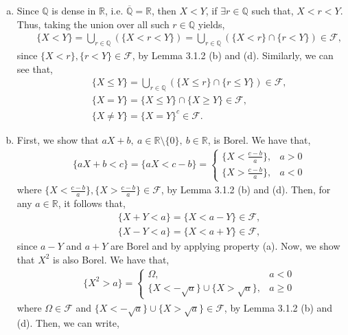 \documentclass{article}
\begin{document}
\begin{enumerate}[(a)]
	\item Since $\mathbb{Q}$ is dense in $\mathbb{R}$, i.e. $\overline{\mathbb{Q}} = \mathbb{R}$, then $X <Y$, if $\exists r \in \mathbb{Q}$ such that, $X < r < Y$. Thus, taking the union over all such $r \in \mathbb{Q}$ yields,
	\begin{eqnarray}
	\nonumber
	&&\{X < Y\} = \bigcup_{r\in\mathbb{Q}}(\{X < r < Y\}) = \bigcup_{r\in\mathbb{Q}}(\{X<r\}\cap\{r<Y\}) \in \mathcal{F},
	\end{eqnarray}
	since $\{X<r\},\{r<Y\} \in \mathcal{F}$, by Lemma 3.1.2 (b) and (d). Similarly, we can see that,
	\begin{eqnarray}
	\nonumber
	&&\{X \leq Y\} = \bigcup_{r\in\mathbb{Q}}(\{X \leq r\}\cap\{r \leq Y\}) \in \mathcal{F},\\
	\nonumber
	&{}&\{X=Y\} = \{X \leq Y\} \cap \{X \geq Y\} \in \mathcal{F},\\
	\nonumber
	&{}&\{X \neq Y\} = \{X=Y\}^c \in \mathcal{F}.
	\end{eqnarray}
	\item First, we show that $aX + b, \ a \in \mathbb{R}\setminus\{0\}, \ b \in \mathbb{R}$, is Borel. We have that,
	\begin{eqnarray}
	\nonumber
	&&\{aX+b < c\} = \{aX < c-b\} =
	\begin{cases}
	\{X < \frac{c-b}{a}\}, & a > 0 \\
	\{X > \frac{c-b}{a}\}, & a < 0
	\end{cases}
	\end{eqnarray}
	where $\{X < \frac{c-b}{a}\}, \{X > \frac{c-b}{a}\} \in \mathcal{F}$, by Lemma 3.1.2 (b) and (d). Then, for any $a \in \mathbb{R}$, it follows that,
	\begin{eqnarray}
	\nonumber
	&&\{X+Y < a\} = \{X < a - Y\} \in \mathcal{F},\\
	\nonumber
	&{}& \{X-Y < a\} = \{X < a + Y\} \in \mathcal{F},
	\end{eqnarray}
	since $a - Y$ and $a + Y$ are Borel and by applying property (a). Now, we show that $X^2$ is also Borel. We have that,
	\begin{eqnarray}
	\nonumber
	&&\{X^2 > a\} =
	\begin{cases}
	\Omega, & a < 0\\
	\{X < -\sqrt{a}\} \cup \{X > \sqrt{a}\}, & a \geq 0
	\end{cases}
	\end{eqnarray}
	where $\Omega \in \mathcal{F}$ and $\{X < -\sqrt{a}\} \cup \{X > \sqrt{a}\} \in \mathcal{F}$, by Lemma 3.1.2 (b) and (d). Then, we can write,

\end{enumerate}
\end{document}
